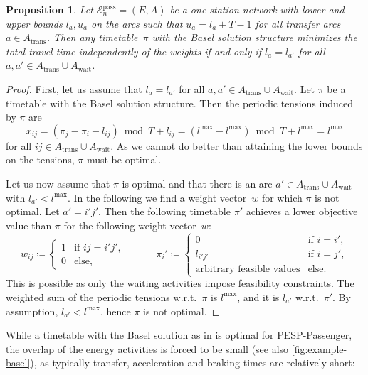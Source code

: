 \documentclass[11pt,a4paper]{article}
\newcommand{\wait}{\mathrm{wait}}
\newcommand{\transfer}{\mathrm{trans}}
\newcommand{\pesppassenger}{PESP-Passenger\xspace}
\newcommand{\osn}{one-station network\xspace}
\newcommand{\cE}{\mathcal{E}}
\newtheorem{proposition}[theorem]{Proposition}
\theoremstyle{definition}
\theoremstyle{remark}
\begin{document}
\begin{proposition}\label{thm:BaselSol}
	Let $\cE_n^{\mathrm{pass}} = (E, A)$ be a \osn with lower and upper bounds $l_{a}, u_{a}$ on the arcs such that $u_{a} = l_{a} + T - 1$ for all transfer arcs $a \in A_{\transfer}$. Then any timetable~$\pi$ with the Basel solution structure minimizes the total travel time independently of the weights if and only if
	$l_{a} = l_{a'}$ for all $a, a' \in A_\transfer \cup A_\wait$.
\end{proposition}

\begin{proof}
	First, let us assume that $l_{a} = l_{a'}$ for all $a, a' \in A_\transfer \cup A_\wait$. Let $\pi$ be a timetable with the Basel solution structure. Then the periodic tensions induced by $\pi$ are 
    $$x_{ij} = (\pi_j - \pi_i -l_{ij}) \bmod T + l_{ij} = (l^{\max} - l^{\max} ) \bmod T + l^{\max} =  l^{\max}$$ for all $ij \in A_\transfer \cup A_\wait$. As we cannot do better than attaining the lower bounds on the tensions, $\pi$ must be optimal.
	
	Let us now assume that $\pi$ is optimal and that there is an arc $a' \in A_\transfer \cup A_\wait$ with $l_{a'}  < l^{\max}$. In the following we find a weight vector~$w$ for which $\pi$ is not optimal. Let $a' = i'j'$. Then the following timetable $\pi'$ achieves a lower objective value than $\pi$ for the following weight vector~$w$:
	\[w_{ij} \coloneqq \begin{cases} 1 &\text{if } ij = i'j', \\ 0 &\text{else,}\end{cases}\qquad\quad \pi_i' \coloneqq \begin{cases} 0 &\text{if } i = i', \\  l_{i'j'} &\text{if } i = j', \\ \text{arbitrary feasible values} &\text{else.} \end{cases}\]
	This is possible as only the waiting activities impose feasibility constraints.
	The weighted sum of the periodic tensions w.r.t.\ $\pi$ is $l^{\max}$, and it is $l_{a'}$ w.r.t.\ $\pi'$. By assumption, $l_{a'} < l^{\max}$, hence $\pi$ is not optimal.
\end{proof}

While a timetable with the Basel solution as in  is optimal for \pesppassenger, the overlap of the energy activities is forced to be small (see also \cref{fig:example-basel}), as typically transfer, acceleration and braking times are relatively short:
\end{document}
